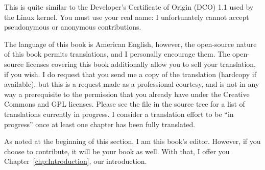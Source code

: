 This is quite similar to the Developer's Certificate of Origin (DCO)
1.1 used by the Linux kernel.
You must use your real name:  I unfortunately cannot accept pseudonymous or
anonymous contributions.

The language of this book is American English, however, the open-source
nature of this book permits translations, and I personally encourage them.
The open-source licenses covering this book additionally allow you
to sell your translation, if you wish.
I do request that you send me a copy of the translation (hardcopy if
available), but this is a request made as a professional courtesy,
and is not in any way a prerequisite to the permission that you already
have under the Creative Commons and GPL licenses.
Please see the  file in the source tree for a list of
translations currently in progress.
I consider a translation effort to be ``in progress'' once at least one
chapter has been fully translated.

As noted at the beginning of this section, I am this book's editor.
However, if you choose to contribute, it will be your book as well.
With that, I offer you Chapter~\ref{chp:Introduction}, our introduction.
